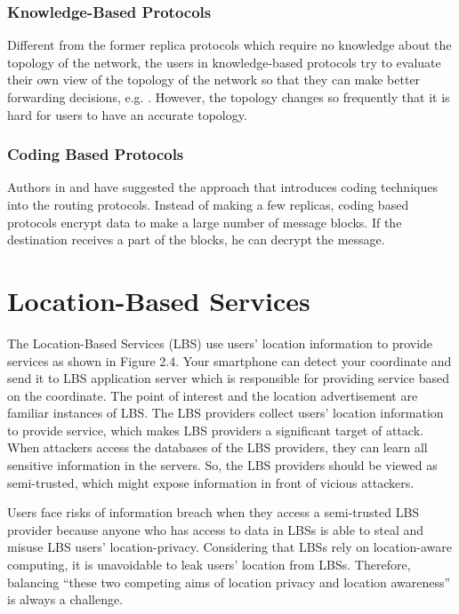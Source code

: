 \subsubsection{  Knowledge-Based Protocols}

\noindent Different from the former replica protocols which require no knowledge about the topology of the network, the users in knowledge-based protocols try to evaluate their own view of the topology of the network so that they can make better forwarding decisions, e.g. \cite{C36}. However, the topology changes so frequently that it is hard for users to have an accurate topology.


\subsubsection{ Coding Based Protocols}

\noindent Authors in \cite {C12} and \cite {C13} have suggested the approach that introduces coding techniques into the routing protocols. Instead of making a few replicas, coding based protocols encrypt data to make a large number of message blocks. If the destination receives a part of the blocks, he can decrypt the message.

\section{ Location-Based Services}

\noindent The Location-Based Services (LBS) use users' location information to provide services as shown in Figure 2.4. Your smartphone can detect your coordinate and send it to LBS application server which is responsible for providing service based on the coordinate. The point of interest and the location advertisement are familiar instances of LBS. The LBS providers collect users' location information to provide service, which makes LBS providers a significant target of attack. When attackers access the databases of the LBS providers, they can learn all sensitive information in the servers. So, the LBS providers should be viewed as semi-trusted, which might expose information in front of vicious attackers.

Users face risks of information breach when they access a semi-trusted LBS provider because anyone who has access to data in LBSs is able to steal and misuse LBS users' location-privacy. Considering that LBSs rely on location-aware computing, it is unavoidable to leak users' location from LBSs. Therefore, balancing ``these two competing aims of location privacy and location awareness'' \cite {C20} is always a challenge.

